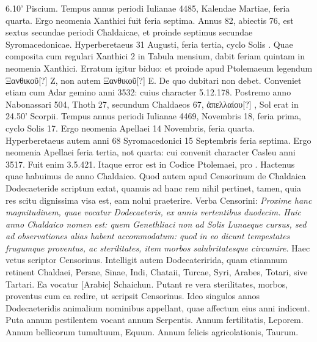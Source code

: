 6.10' Piscium.
Tempus annus periodi Iulianae %
 4485, Kalendae
Martiae, %
 feria quarta.
Ergo neomenia Xanthici fuit feria septima.
Annus
82, abiectis 76, est sextus secundae periodi Chaldaicae, et proinde
septimus secundae Syromacedonicae.
Hyperberetaeus 31 Augusti, feria
tertia, cyclo Solis .
Quae composita cum regulari Xanthici 2 in
Tabula mensium, dabit feriam quintam in neomenia Xanthici.
Erratum
igitur biduo: et proinde apud Ptolemaeum legendum \textgreek{Ξανθικοῦ[?]} Z,
non autem \textgreek{Ξανθικοῦ[?]} E.
De quo dubitari non debet.
Conveniet etiam
cum Adar gemino anni 3532: cuius character 5.12.178.
Postremo anno
Nabonassari 504, Thoth 27, secundum Chaldaeos 67, \textgreek{ἀπελλαίου[?]
 }, Sol erat in 24.50' Scorpii.
Tempus annus periodi Iulianae 4469,
Novembris 18, feria prima, cyclo Solis 17.
Ergo neomenia Apellaei 14
Novembris, feria quarta.
Hyperberetaeus autem anni 68 Syromacedonici
15 Septembris feria septima.
Ergo neomenia Apellaei feria tertia,
not quarta: cui convenit character Casleu anni 3517.
Fuit enim 3.5.421.
Itaque error est in Codice Ptolemaei,
 \textgreek{} pro \textgreek{}.
Hactenus quae habuimus
de anno Chaldaico.
Quod autem apud Censorinum de Chaldaica
Dodecaeteride scriptum extat, quanuis ad hanc rem nihil pertinet,
tamen, quia res scitu dignissima visa est, eam nolui praeterire.
Verba Censorini:
\textit{Proxime hanc magnitudinem, quae vocatur Dodecaeteris,
ex annis vertentibus duodecim.}
\textit{Huic anno Chaldaico nomen est: quem
Genethliaci non ad Solis Lunaeque cursus, sed ad observationes alias habent 
accommodatum: quod in eo dicunt tempestates frugumque proventus,
ac sterilitates, item morbos salubritatesque circumire.}
Haec %
 vetus scriptor
Censorinus.
Intelligit autem Dodecateririda, quam etiamnum retinent
Chaldaei, Persae, Sinae, %
 Indi, Chataii, Turcae, Syri, Arabes, Totari,
sive Tartari.
Ea vocatur \textarabic{[Arabic]} Schaichun.
Putant re vera sterilitates,
morbos, proventus cum ea redire, ut scripsit Censorinus. %
Ideo singulos
annos Dodecaeteridis animalium nominibus appellant, quae affectum
eius anni indicent.
Puta annum pestilentem vocant annum Serpentis.
Annum
fertilitatis, Leporem.
Annum bellicorum tumultuum, Equum.
Annum
felicis agricolationis, Taurum.
